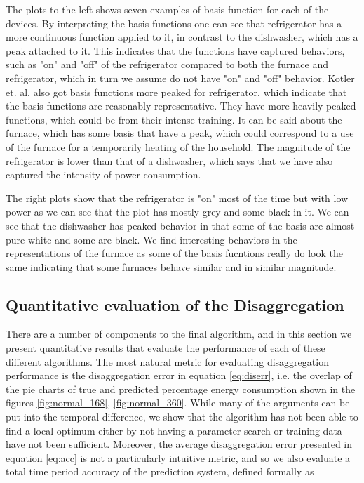 The plots to the left shows seven examples of basis function for each of the devices. By interpreting the basis functions one can see that refrigerator has a more continuous function applied to it, in contrast to the dishwasher, which has a peak attached to it. This indicates that the functions have captured behaviors, such as "on" and "off" of the refrigerator compared to both the furnace and refrigerator, which in turn we assume do not have "on" and "off" behavior. Kotler et. al. \cite{DDSC} also got basis functions more peaked for refrigerator, which indicate that the basis functions are reasonably representative. They have more heavily peaked functions, which could be from their intense training. It can be said about the furnace, which has some basis that have a peak, which could correspond to a use of the furnace for a temporarily heating of the household. The magnitude of the refrigerator is lower than that of a dishwasher, which says that we have also captured the intensity of power consumption.

The right plots show that the refrigerator is "on" most of the time but with low power as we can see that the plot has mostly grey and some black in it. We can see that the dishwasher has peaked behavior in that some of the basis are almost pure white and some are black. We find interesting behaviors in the representations of the furnace as some of the basis fucntions really do look the same indicating that some furnaces behave similar and in similar magnitude.

\subsection{Quantitative evaluation of the Disaggregation}
\label{sec:quant}

There are a number of components to the final algorithm, and in this section we present quantitative results that evaluate the performance of each of these different algorithms. The most natural metric for evaluating disaggregation performance is the disaggregation error in equation \ref{eq:diserr}, i.e. the overlap of the pie charts of true and predicted percentage energy consumption shown in the figures \ref{fig:normal_168}, \ref{fig:normal_360}. While many of the arguments can be put into the temporal difference, we show that the algorithm has not been able to find a local optimum either by not having a parameter search or training data have not been sufficient. Moreover, the average disaggregation error presented in equation \ref{eq:acc} is not a particularly intuitive metric, and so we also evaluate a total time period accuracy of the prediction system, defined formally as

